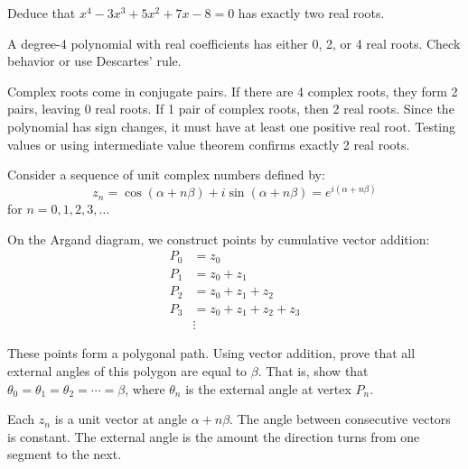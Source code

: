 \begin{problem}
Deduce that $x^4 - 3x^3 + 5x^2 + 7x - 8 = 0$ has exactly two real roots.
\end{problem}

\begin{hint}
A degree-4 polynomial with real coefficients has either 0, 2, or 4 real roots. Check behavior or use Descartes' rule.
\end{hint}

\begin{solution}[Sketch]
Complex roots come in conjugate pairs. If there are 4 complex roots, they form 2 pairs, leaving 0 real roots. If 1 pair of complex roots, then 2 real roots. Since the polynomial has sign changes, it must have at least one positive real root. Testing values or using intermediate value theorem confirms exactly 2 real roots.
\end{solution}

\begin{problem}
Consider a sequence of unit complex numbers defined by:
$$z_n = \cos(\alpha+n\beta) + i\sin(\alpha+n\beta) = e^{i(\alpha+n\beta)}$$
for $n = 0, 1, 2, 3, \ldots$

On the Argand diagram, we construct points by cumulative vector addition:
\begin{align*}
P_0 &= z_0\\
P_1 &= z_0 + z_1\\
P_2 &= z_0 + z_1 + z_2\\
P_3 &= z_0 + z_1 + z_2 + z_3\\
&\vdots
\end{align*}

These points form a polygonal path. Using vector addition, prove that all external angles of this polygon are equal to $\beta$. That is, show that $\theta_0 = \theta_1 = \theta_2 = \cdots = \beta$, where $\theta_n$ is the external angle at vertex $P_n$.
\end{problem}

\begin{hint}
Each $z_n$ is a unit vector at angle $\alpha + n\beta$. The angle between consecutive vectors is constant. The external angle is the amount the direction turns from one segment to the next.
\end{hint}

